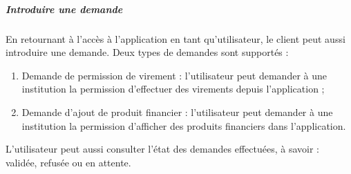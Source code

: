 \subparagraph{Introduire une demande}
En retournant à l'accès à l'application en tant qu'utilisateur, le client peut aussi introduire une demande. Deux types de demandes sont supportés :
\begin{enumerate}
\item Demande de permission de virement : l'utilisateur peut demander à une institution la permission d'effectuer des virements depuis l'application ;
\item Demande d'ajout de produit financier : l'utilisateur peut demander à une institution la permission d'afficher des produits financiers dans l'application.
\end{enumerate}
L'utilisateur peut aussi consulter l'état des demandes effectuées, à savoir : validée, refusée ou en attente.